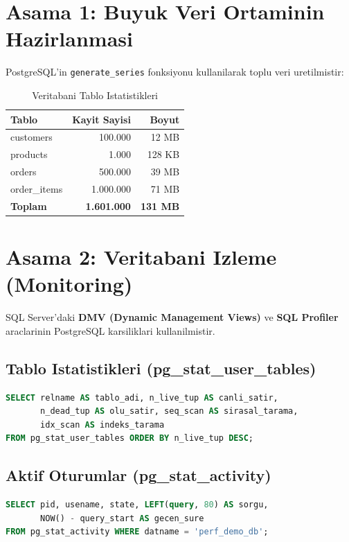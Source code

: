 \documentclass[12pt,a4paper]{article}
\begin{document}
\section{Asama 1: Buyuk Veri Ortaminin Hazirlanmasi}
PostgreSQL'in \texttt{generate\_series} fonksiyonu kullanilarak toplu veri uretilmistir:

\begin{table}[h]
\centering
\begin{tabular}{|l|r|r|}
\hline
\textbf{Tablo} & \textbf{Kayit Sayisi} & \textbf{Boyut} \\
\hline
customers & 100.000 & 12 MB \\
products & 1.000 & 128 KB \\
orders & 500.000 & 39 MB \\
order\_items & 1.000.000 & 71 MB \\
\hline
\textbf{Toplam} & \textbf{1.601.000} & \textbf{131 MB} \\
\hline
\end{tabular}
\caption{Veritabani Tablo Istatistikleri}
\end{table}

\section{Asama 2: Veritabani Izleme (Monitoring)}
SQL Server'daki \textbf{DMV (Dynamic Management Views)} ve \textbf{SQL Profiler} araclarinin PostgreSQL karsiliklari kullanilmistir.

\subsection{Tablo Istatistikleri (pg\_stat\_user\_tables)}
\begin{lstlisting}[language=SQL, caption=DMV Karsiligi Tablo Izleme]
SELECT relname AS tablo_adi, n_live_tup AS canli_satir,
       n_dead_tup AS olu_satir, seq_scan AS sirasal_tarama,
       idx_scan AS indeks_tarama
FROM pg_stat_user_tables ORDER BY n_live_tup DESC;
\end{lstlisting}

\subsection{Aktif Oturumlar (pg\_stat\_activity)}
\begin{lstlisting}[language=SQL, caption=SQL Profiler Karsiligi]
SELECT pid, usename, state, LEFT(query, 80) AS sorgu,
       NOW() - query_start AS gecen_sure
FROM pg_stat_activity WHERE datname = 'perf_demo_db';
\end{lstlisting}
\end{document}
